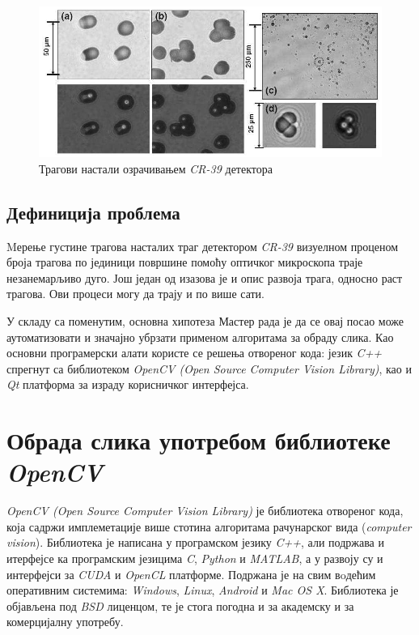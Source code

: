 \documentclass[11pt,a4paper,serbian,oneside]{book}
\begin{document}
\begin{figure}[h]
\begin{center}
\includegraphics[width=150mm]{images/dosimetry.png}
\end{center}
\caption{Трагови настали озрачивањем \textit{CR-39} детектора}
\label{fig:trag}
\end{figure}

\section{Дефиниција проблема}

Mерење густине трагова насталих траг детектором \textit{CR-39} визуелном проценом броја трагова по јединици површине помоћу оптичког микроскопа траје незанемарљиво дуго. Још један од изазова је и опис развоја трага, односно раст трагова. Ови процеси могу да трају и по више сати. 

У складу са поменутим, основна хипотеза Мастер рада је да се овај посао може ауто\-ма\-ти\-зо\-ва\-ти и значајно убрзати применом алгоритама за обраду слика. Као основни програмерски алати користе се решења отвореног кода:
језик \textit{C++} спрегнут са библиотеком \textit{OpenCV (Open Source Computer Vision Library)}, као и \textit{Qt} платформа за израду корисничког ин\-тер\-феј\-са.

%
%
%

\chapter{Обрада слика употребом библиотеке \textit{OpenCV}}

\textit{OpenCV (Open Source Computer Vision Library)} \cite{opencv} је библиотека отвореног кода, која садржи имплеметације више стотина алгоритама рачунарског вида (\textit{computer vision}). Би\-бли\-о\-те\-ка је написана у  програмском језику \textit{C++}, али подржава и итерфејсе ка програмским језицима \textit{C}, \textit{Python} и \textit{MATLAB}, а у развоју су и интерфејси за \textit{CUDA} и \textit{OpenCL} платформе. Подржана је на свим вoдећим оперативним системима: \textit{Windows}, \textit{Linux}, \textit{Android} и \textit{Mac OS X}. Библиотека је објављена под \textit{BSD} лиценцом, те је стога погодна  и за академску и за комерцијалну употребу.
\end{document}
